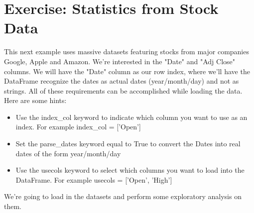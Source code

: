 \documentclass{article}
\begin{document}
\section{Exercise: Statistics from Stock Data}\label{sec:exercise3}
This next example uses massive datasets featuring stocks from major companies Google, Apple and Amazon. We're interested in the "Date" and "Adj Close" columns. We will have the "Date" column as our row index, where we'll have the DataFrame recognize the dates as actual dates (year/month/day) and not as strings. All of these requirements can be accomplished while loading the data. Here are some hints:
\begin{itemize}
	\item Use the index\_col keyword to indicate which column you want to use as an index. For example index\_col = ['Open']
	\item Set the parse\_dates keyword equal to True to convert the Dates into real dates of the form year/month/day
	\item Use the usecols keyword to select which columns you want to load into the DataFrame. For example usecols = ['Open', 'High']
\end{itemize}

We're going to load in the datasets and perform some exploratory analysis on them.
\end{document}
